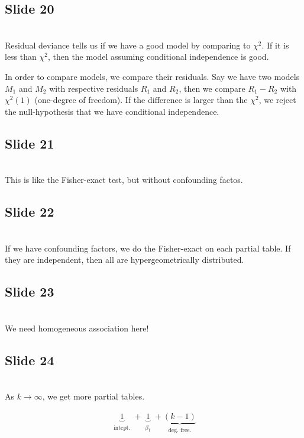 \subsection{Slide 20}\hfill\\
\noindent Residual deviance tells us if we have a good model by comparing to $\chi^2$. If it is less than $\chi^2$, then the model assuming conditional independence is good.
\par\bigskip
\noindent In order to compare models, we compare their residuals. Say we have two models $M_1$ and $M_2$ with respective residuals $R_1$ and $R_2$, then we compare $R_1-R_2$ with $\chi^2(1)$ (one-degree of freedom). If the difference is larger than the $\chi^2$, we reject the null-hypothesis that we have conditional independence. 
\par\bigskip
\subsection{Slide 21}\hfill\\
\noindent This is like the Fisher-exact test, but without confounding factos.
\par\bigskip
\subsection{Slide 22}\hfill\\
\noindent If we have confounding factors, we do the Fisher-exact on each partial table. If they are independent, then all are hypergeometrically distributed. 
\par\bigskip
\subsection{Slide 23}\hfill\\
\noindent We need homogeneous association here!
\par\bigskip
\subsection{Slide 24}\hfill\\
\noindent As $k\to\infty$, we get more partial tables.\par
\begin{equation*}
  \begin{gathered}
    \underbrace{1}_{\substack{\text{intcpt.}}}+\underbrace{1}_{\substack{\beta_1}}+\underbrace{(k-1)}_{\substack{\text{deg. free.}}}
  \end{gathered}
\end{equation*}
\par\bigskip
